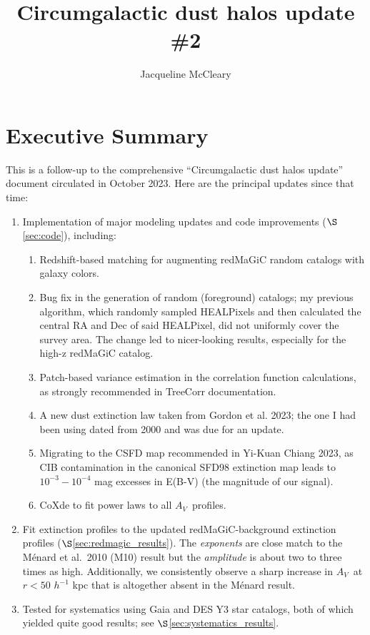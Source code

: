 \documentclass[11pt, oneside]{article}   	%
\title{Circumgalactic dust halos update \#2}
\author{Jacqueline McCleary}
\newcommand{\av}{$A_V$~}
\newcommand{\hinv}{$h^{-1}$\xspace}
\begin{document}
\maketitle

\section{Executive Summary}\label{execsumm}

This is a follow-up to the comprehensive ``Circumgalactic dust halos update'' document circulated in October 2023. Here are the principal updates since that time: 
\begin{enumerate}
	\item Implementation of major modeling updates and code improvements ($\S$\ref{sec:code}), including: 
		\begin{enumerate}
		\item Redshift-based matching for augmenting redMaGiC random catalogs with galaxy colors.%
		\item Bug fix in the generation of random (foreground) catalogs; my previous algorithm, which randomly sampled HEALPixels and then calculated the central RA and Dec of said HEALPixel, did not uniformly cover the survey area. The change led to nicer-looking results, especially for the high-z redMaGiC catalog. 
		\item Patch-based variance estimation in the correlation function calculations, as strongly recommended in TreeCorr documentation. 
		\item A new dust extinction law taken from Gordon et al. 2023; the one I had been using dated from 2000 and was due for an update. 
		\item Migrating to the CSFD map recommended in Yi-Kuan Chiang 2023, as CIB contamination in the canonical SFD98 extinction map leads to $10^{-3}-10^{-4}$ mag excesses in E(B-V) (the magnitude of our signal).
		\item CoXde to fit power laws to all \av profiles.
		\end{enumerate}
	\item Fit extinction profiles to the updated redMaGiC-background extinction profiles ($\S$\ref{sec:redmagic_results}). The \textit{exponents} are close match to the M\'{e}nard et al.~2010 (M10) result but the \textit{amplitude} is about two to three times as high. Additionally, we consistently observe a sharp increase in \av at $r < 50$ \hinv kpc that is altogether absent in the  M\'{e}nard result. 
	\item Tested for systematics using Gaia and DES Y3 star catalogs, both of which yielded quite good results; see $\S$\ref{sec:systematics_results}. 

\end{enumerate}
\end{document}
